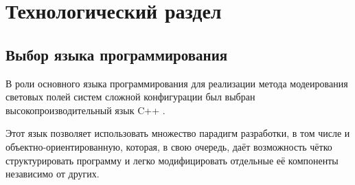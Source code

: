 
\chapter{Технологический раздел}

\section{Выбор языка программирования}

В роли основного языка программирования для реализации метода модеирования световых полей систем сложной конфигурации был выбран высокопроизводительный язык C++ \cite{cpp}.

Этот язык позволяет использовать множество парадигм разработки, в том числе и объектно-ориентированную, которая, в свою очередь, даёт возможность чётко структурировать программу и легко модифицировать отдельные её компоненты независимо от других.

